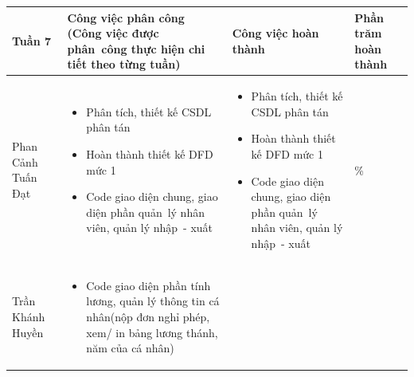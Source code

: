 \documentclass[a4paper,12pt]{report}
\begin{document}
\noindent
\begin{center}
    \begin{longtable}{|>{\centering\arraybackslash}p{3cm}|
        >{\centering\arraybackslash}p{5.5cm}|
        >{\centering\arraybackslash}p{5.5cm}|
        >{\centering\arraybackslash}p{1.5cm}|}
        \hline
        \textbf{Tuần 7}                                                                                                               &
        \textbf{Công việc phân công \newline
            (Công việc được phân~công thực hiện chi tiết theo từng tuần)
        }                                                                                                                             &
        \textbf{Công việc hoàn thành}                                                                                                 &
        \textbf{Phần trăm hoàn thành}                                                                                                         \\
        \hline
        Phan Cảnh Tuấn Đạt                                                                                                            &
        \begin{itemize}
            \item Phân tích, thiết kế CSDL phân tán
            \item Hoàn thành thiết kế DFD mức 1
            \item Code giao diện chung, giao diện phần quản~lý nhân viên, quản lý nhập~- xuất
        \end{itemize}                                             &
        \begin{itemize}
            \item Phân tích, thiết kế CSDL phân tán
            \item Hoàn thành thiết kế DFD mức 1
            \item Code giao diện chung, giao diện phần quản~lý nhân viên, quản lý nhập~- xuất
        \end{itemize}
                                                                                                                                      & 100\% \\
        \hline
        Trần Khánh Huyền                                                                                                              &
        \begin{itemize}
            \item Code giao diện phần tính lương, quản lý thông tin cá nhân(nộp đơn nghỉ phép, xem/ in bảng lương thánh, năm của cá nhân)

\end{itemize}
\end{longtable}
\end{center}
\end{document}
